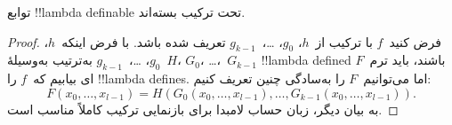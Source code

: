 \documentclass[../../../include/open-logic-section]{subfiles}
\begin{document}

\begin{lem}
توابع !!{lambda definable} تحت ترکیب بسته‌اند.
\end{lem}

\begin{proof}
فرض کنید~$f$ با ترکیب از~$h$، $g_0$،
\dots،~$g_{k-1}$ تعریف شده باشد. با فرض اینکه~$h$، $g_0$،
\dots،~$g_{k-1}$ به‌ترتیب به‌وسیلهٔ~$H$، $G_0$،
\dots،~$G_{k-1}$ !!{lambda defined} باشند، باید ترم~$F$ای بیابیم که~$f$
را !!{lambda define}s. اما می‌توانیم~$F$ را به‌سادگی چنین تعریف کنیم:
\[
F(x_0, \dots, x_{l-1}) = H(G_0(x_0, \dots, x_{l-1}),
\dots, G_{k-1}(x_0, \dots, x_{l-1})).
\]
به بیان دیگر، زبان حساب لامبدا برای بازنمایی ترکیب کاملاً مناسب است.
\end{proof}
\end{document}
